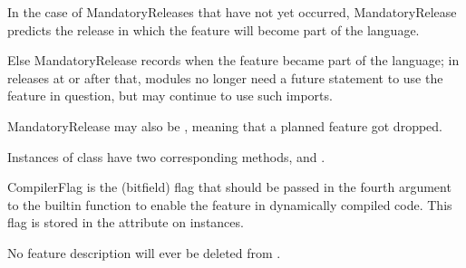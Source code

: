 In the case of MandatoryReleases that have not yet occurred,
MandatoryRelease predicts the release in which the feature will become
part of the language.

Else MandatoryRelease records when the feature became part of the
language; in releases at or after that, modules no longer need a
future statement to use the feature in question, but may continue to
use such imports. 

MandatoryRelease may also be , meaning that a planned
feature got dropped.

Instances of class  have two corresponding methods,
 and .

CompilerFlag is the (bitfield) flag that should be passed in the
fourth argument to the builtin function  to enable
the feature in dynamically compiled code.  This flag is stored in the
 attribute on  instances.

No feature description will ever be deleted from .

